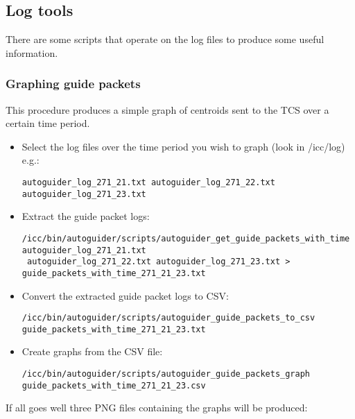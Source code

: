 \documentclass[10pt,a4paper]{article}
\begin{document}
\subsection{Log tools}

There are some scripts that operate on the log files to produce some useful information.

\subsubsection{Graphing guide packets}

This procedure produces a simple graph of centroids sent to the TCS over a certain time period.

\begin{itemize}

\item Select the log files over the time period you wish to graph (look in /icc/log) e.g.: 

\begin{verbatim}
autoguider_log_271_21.txt autoguider_log_271_22.txt autoguider_log_271_23.txt
\end{verbatim}

\item Extract the guide packet logs:

\begin{verbatim}
/icc/bin/autoguider/scripts/autoguider_get_guide_packets_with_time autoguider_log_271_21.txt
 autoguider_log_271_22.txt autoguider_log_271_23.txt > guide_packets_with_time_271_21_23.txt
\end{verbatim}

\item Convert the extracted guide packet logs to CSV:

\begin{verbatim}
/icc/bin/autoguider/scripts/autoguider_guide_packets_to_csv guide_packets_with_time_271_21_23.txt
\end{verbatim}

\item Create graphs from the CSV file:

\begin{verbatim}
/icc/bin/autoguider/scripts/autoguider_guide_packets_graph guide_packets_with_time_271_21_23.csv
\end{verbatim}

\end{itemize}

If all goes well three PNG files containing the graphs will be produced:
\end{document}
